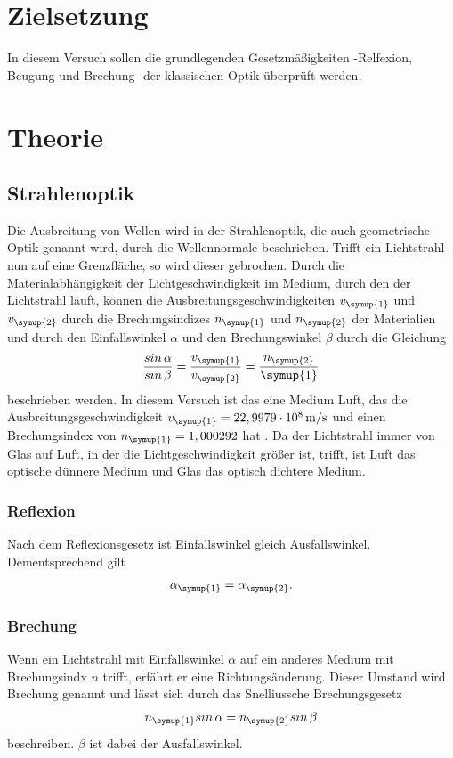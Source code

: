 \section{Zielsetzung}
\label{sec:Zielsetzung}
In diesem Versuch sollen die grundlegenden Gesetzmäßigkeiten -Relfexion, Beugung und Brechung- der klassischen Optik überprüft werden.

\section{Theorie}
\label{sec:Theorie}

\subsection{Strahlenoptik}
\label{sec:Strahlenoptik}
Die Ausbreitung von Wellen wird in der Strahlenoptik, die auch geometrische Optik genannt wird, durch die Wellennormale beschrieben.
Trifft ein Lichtstrahl nun auf eine Grenzfläche, so wird dieser gebrochen. Durch die Materialabhängigkeit der Lichtgeschwindigkeit im
Medium, durch den der Lichtstrahl läuft, können die Ausbreitungsgeschwindigkeiten $v_{\symup{1}}$ und $v_{\symup{2}}$ durch die
Brechungsindizes $n_{\symup{1}}$ und $n_{\symup{2}}$ der Materialien und durch den Einfallswinkel $\alpha$ und den Brechungswinkel
$\beta$ durch die Gleichung
\begin{align*}
    \frac{sin\,\alpha}{sin\,\beta} = \frac{v_{\symup{1}}}{v_{\symup{2}}} = \frac{n_{\symup{2}}}{\symup{1}}
\end{align*}
beschrieben werden. In diesem Versuch ist das eine Medium Luft, das die Ausbreitungsgeschwindigkeit $v_{\symup{1}} = 22,9979 \cdot
10^{8}\,\unit{\meter\per\second}$ und einen Brechungsindex von $n_{\symup{1}} = 1,000292$ hat \cite{sample}. Da der Lichtstrahl 
immer von Glas auf Luft, in der die Lichtgeschwindigkeit größer ist, trifft, ist Luft das optische dünnere Medium und Glas das
optisch dichtere Medium.

\subsubsection{Reflexion}
\label{sec:Reflexion}
Nach dem Reflexionsgesetz ist Einfallswinkel gleich Ausfallswinkel. Dementsprechend gilt
\begin{align}
    \label{eqn:Reflexion}
    \alpha_{\symup{1}} = \alpha_{\symup{2}}.
\end{align}

\subsubsection{Brechung}
\label{sec:Brechung}
Wenn ein Lichtstrahl mit Einfallswinkel $\alpha$ auf ein anderes Medium mit Brechungsindx $n$ trifft,
erfährt er eine Richtungsänderung. Dieser Umstand wird Brechung genannt und lässt sich durch das Snelliussche 
Brechungsgesetz
\begin{align}
    \label{eqn:Snellius}
    n_{\symup{1}}sin\,\alpha = n_{\symup{2}}sin\,\beta
\end{align}
beschreiben. $\beta$ ist dabei der Ausfallswinkel.

